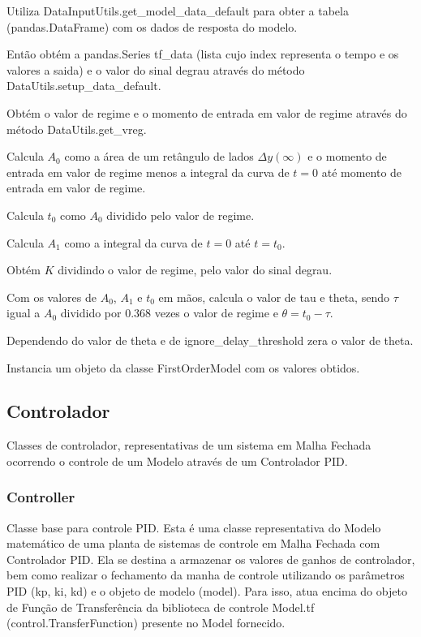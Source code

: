 \begin{alineas}
    \item Utiliza DataInputUtils.get\_model\_data\_default para obter a tabela (pandas.DataFrame) com os dados de resposta do modelo.
    \item Então obtém a pandas.Series tf\_data (lista cujo index representa o tempo e os valores a saida) e o valor do sinal degrau através do método DataUtils.setup\_data\_default.
    \item Obtém o valor de regime e o momento de entrada em valor de regime através do método DataUtils.get\_vreg.
    \item Calcula $A_0$ como a área de um retângulo de lados $\Delta y(\infty)$ e o momento de entrada em valor de regime menos a integral da curva de $t = 0$ até momento de entrada em valor de regime.
    \item Calcula $t_0$ como $A_0$ dividido pelo valor de regime.
    \item Calcula $A_1$ como a integral da curva de $t = 0$ até $t = t_0$.
    \item Obtém $K$ dividindo o valor de regime, pelo valor do sinal degrau.
    \item Com os valores de $A_0$, $A_1$ e $t_0$ em mãos, calcula o valor de tau e theta, sendo $\tau$ igual a $A_0$ dividido por 0.368 vezes o valor de regime e $\theta = t_0 - \tau$.
    \item Dependendo do valor de theta e de ignore\_delay\_threshold zera o valor de theta.
    \item Instancia um objeto da classe FirstOrderModel com os valores obtidos.
\end{alineas}

\subsection{Controlador}

Classes de controlador, representativas de um sistema em Malha Fechada ocorrendo o controle de um Modelo através de um
Controlador PID\@.

\subsubsection{Controller}

Classe base para controle PID\@.
Esta é uma classe representativa do Modelo matemático de uma planta de sistemas de controle em Malha Fechada com
Controlador PID\@.
Ela se destina a armazenar os valores de ganhos de controlador, bem como realizar o fechamento da manha de controle
utilizando os parâmetros PID (kp, ki, kd) e o objeto de modelo (model).
Para isso, atua encima do objeto de Função de Transferência da biblioteca de controle Model.tf
(control.TransferFunction) presente no Model fornecido.

